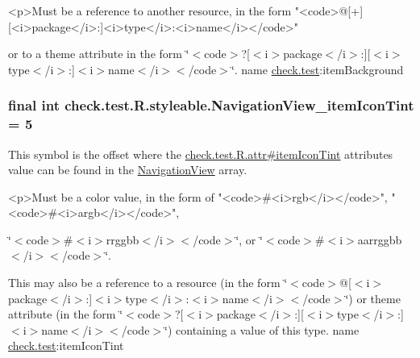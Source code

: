 \begin{DoxyVerb}      <p>Must be a reference to another resource, in the form "<code>@[+][<i>package</i>:]<i>type</i>:<i>name</i></code>"
\end{DoxyVerb}
 or to a theme attribute in the form \char`\"{}$<$code$>$?\mbox{[}$<$i$>$package$<$/i$>$\+:\mbox{]}\mbox{[}$<$i$>$type$<$/i$>$\+:\mbox{]}$<$i$>$name$<$/i$>$$<$/code$>$\char`\"{}.  name \hyperlink{namespacecheck_1_1test}{check.\+test}\+:item\+Background \hypertarget{classcheck_1_1test_1_1_r_1_1styleable_ae351f9847230f9848b52f060c63c4bdd}{}
\subsubsection[{Navigation\+View\+\_\+item\+Icon\+Tint}]{\setlength{\rightskip}{0pt plus 5cm}final int check.\+test.\+R.\+styleable.\+Navigation\+View\+\_\+item\+Icon\+Tint = 5\hspace{0.3cm}{\ttfamily [static]}}\label{classcheck_1_1test_1_1_r_1_1styleable_ae351f9847230f9848b52f060c63c4bdd}
This symbol is the offset where the \hyperlink{classcheck_1_1test_1_1_r_1_1attr_afb89a06e82ef49ce6b57555061f15032}{check.\+test.\+R.\+attr\#item\+Icon\+Tint} attribute\textquotesingle{}s value can be found in the \hyperlink{classcheck_1_1test_1_1_r_1_1styleable_a70ac59d722f1e4aac4b206dcf5f53107}{Navigation\+View} array.

\begin{DoxyVerb}      <p>Must be a color value, in the form of "<code>#<i>rgb</i></code>", "<code>#<i>argb</i></code>",
\end{DoxyVerb}
 \char`\"{}$<$code$>$\#$<$i$>$rrggbb$<$/i$>$$<$/code$>$\char`\"{}, or \char`\"{}$<$code$>$\#$<$i$>$aarrggbb$<$/i$>$$<$/code$>$\char`\"{}. 

This may also be a reference to a resource (in the form \char`\"{}$<$code$>$@\mbox{[}$<$i$>$package$<$/i$>$\+:\mbox{]}$<$i$>$type$<$/i$>$\+:$<$i$>$name$<$/i$>$$<$/code$>$\char`\"{}) or theme attribute (in the form \char`\"{}$<$code$>$?\mbox{[}$<$i$>$package$<$/i$>$\+:\mbox{]}\mbox{[}$<$i$>$type$<$/i$>$\+:\mbox{]}$<$i$>$name$<$/i$>$$<$/code$>$\char`\"{}) containing a value of this type.  name \hyperlink{namespacecheck_1_1test}{check.\+test}\+:item\+Icon\+Tint \hypertarget{classcheck_1_1test_1_1_r_1_1styleable_ad7564a8ef74749a8d3928c139af4eaa6}{}
